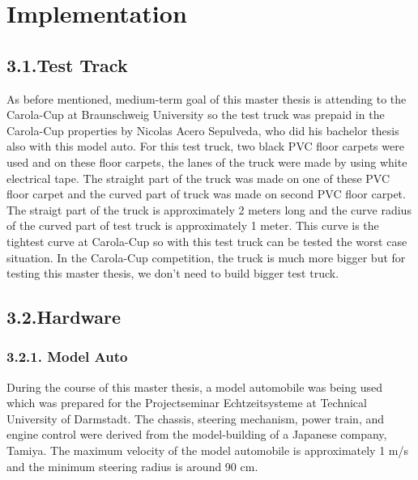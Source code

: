 %
\chapter{Implementation}\label{cha:Implementation}
%
\section*{3.1.Test Track}\label{sec:Test Track}

As before mentioned, medium-term goal of this master thesis is attending to the Carola-Cup at Braunschweig University 
so the test truck was prepaid in the Carola-Cup properties by Nicolas Acero Sepulveda, who did his bachelor thesis also
with this model auto. For this test truck, two black PVC floor carpets were used and on these floor carpets, the lanes 
of the truck were made by using white electrical tape. The straight part of the truck was made on one of these PVC 
floor carpet and the curved part of truck was made on second PVC floor carpet. The straigt part of the truck is 
approximately 2 meters long and the curve radius of the curved part of test truck is approximately 1 meter. This curve 
is the tightest curve at Carola-Cup so with this test truck can be tested the worst case situation. In the Carola-Cup 
competition, the truck is much more bigger but for testing this master thesis, we don't need to build bigger test truck.


%
\section*{3.2.Hardware}\label{sec:Hardware}

%
\subsection*{3.2.1. Model Auto}\label{sec:Model Auto}

During the course of this master thesis, a model automobile was being used which was prepared for the Projectseminar 
Echtzeitsysteme at Technical University of Darmstadt. The chassis, steering mechanism, power train, and engine control 
were derived from the model-building of a Japanese company, Tamiya. The maximum velocity of the model automobile is 
approximately 1 m/s and the minimum steering radius is around 90 cm. 

%

